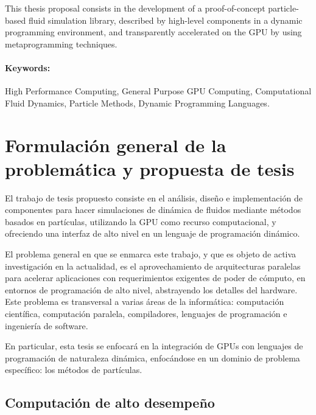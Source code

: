 \documentclass[11pt,spanish]{article}
\begin{document}
This thesis proposal consists in the development of a proof-of-concept
particle-based fluid simulation library, described by high-level components in a
dynamic programming environment, and transparently accelerated on the GPU by
using metaprogramming techniques.

\paragraph{Keywords:}
High Performance Computing,
General Purpose GPU Computing,
Computational Fluid Dynamics,
Particle Methods,
Dynamic Programming Languages.

\newpage
\section{Formulación general de la problemática y propuesta de tesis}

%

El trabajo de tesis propuesto consiste en el análisis, diseño e implementación
de componentes para hacer simulaciones de dinámica de fluidos mediante métodos
basados en partículas, utilizando la GPU como recurso computacional, y
ofreciendo una interfaz de alto nivel en un lenguaje de programación dinámico.

El problema general en que se enmarca este trabajo, y que es objeto de activa
investigación en la actualidad, es el aprovechamiento de arquitecturas paralelas
para acelerar aplicaciones con requerimientos exigentes de poder de cómputo, en
entornos de programación de alto nivel, abstrayendo los detalles del hardware.
Este problema es transversal a varias áreas de la informática: computación
científica, computación paralela, compiladores, lenguajes de programación e
ingeniería de software.

En particular, esta tesis se enfocará en la integración de GPUs con lenguajes de
programación de naturaleza dinámica, enfocándose en un dominio de problema
específico: los métodos de partículas.


\subsection{Computación de alto desempeño}
\end{document}
